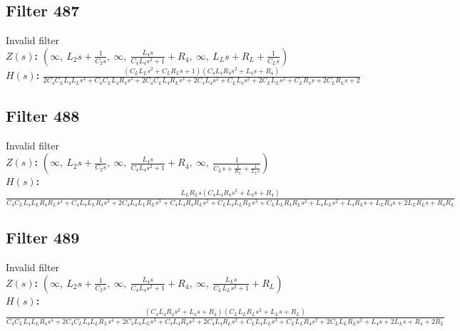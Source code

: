 \documentclass{article}
\begin{document}
\subsection*{Filter 487}
Invalid filter \\ 
\textbf{$Z(s)$:} $\left( \infty, \  L_{2} s + \frac{1}{C_{2} s}, \  \infty, \  \frac{L_{4} s}{C_{4} L_{4} s^{2} + 1} + R_{4}, \  \infty, \  L_{L} s + R_{L} + \frac{1}{C_{L} s}\right)$ \\ 
\textbf{$H(s)$:} $\frac{\left(C_{L} L_{L} s^{2} + C_{L} R_{L} s + 1\right) \left(C_{4} L_{4} R_{4} s^{2} + L_{4} s + R_{4}\right)}{2 C_{4} C_{L} L_{4} L_{L} s^{4} + C_{4} C_{L} L_{4} R_{4} s^{3} + 2 C_{4} C_{L} L_{4} R_{L} s^{3} + 2 C_{4} L_{4} s^{2} + C_{L} L_{4} s^{2} + 2 C_{L} L_{L} s^{2} + C_{L} R_{4} s + 2 C_{L} R_{L} s + 2}$ \\ 
\subsection*{Filter 488}
Invalid filter \\ 
\textbf{$Z(s)$:} $\left( \infty, \  L_{2} s + \frac{1}{C_{2} s}, \  \infty, \  \frac{L_{4} s}{C_{4} L_{4} s^{2} + 1} + R_{4}, \  \infty, \  \frac{1}{C_{L} s + \frac{1}{R_{L}} + \frac{1}{L_{L} s}}\right)$ \\ 
\textbf{$H(s)$:} $\frac{L_{L} R_{L} s \left(C_{4} L_{4} R_{4} s^{2} + L_{4} s + R_{4}\right)}{C_{4} C_{L} L_{4} L_{L} R_{4} R_{L} s^{4} + C_{4} L_{4} L_{L} R_{4} s^{3} + 2 C_{4} L_{4} L_{L} R_{L} s^{3} + C_{4} L_{4} R_{4} R_{L} s^{2} + C_{L} L_{4} L_{L} R_{L} s^{3} + C_{L} L_{L} R_{4} R_{L} s^{2} + L_{4} L_{L} s^{2} + L_{4} R_{L} s + L_{L} R_{4} s + 2 L_{L} R_{L} s + R_{4} R_{L}}$ \\ 
\subsection*{Filter 489}
Invalid filter \\ 
\textbf{$Z(s)$:} $\left( \infty, \  L_{2} s + \frac{1}{C_{2} s}, \  \infty, \  \frac{L_{4} s}{C_{4} L_{4} s^{2} + 1} + R_{4}, \  \infty, \  \frac{L_{L} s}{C_{L} L_{L} s^{2} + 1} + R_{L}\right)$ \\ 
\textbf{$H(s)$:} $\frac{\left(C_{4} L_{4} R_{4} s^{2} + L_{4} s + R_{4}\right) \left(C_{L} L_{L} R_{L} s^{2} + L_{L} s + R_{L}\right)}{C_{4} C_{L} L_{4} L_{L} R_{4} s^{4} + 2 C_{4} C_{L} L_{4} L_{L} R_{L} s^{4} + 2 C_{4} L_{4} L_{L} s^{3} + C_{4} L_{4} R_{4} s^{2} + 2 C_{4} L_{4} R_{L} s^{2} + C_{L} L_{4} L_{L} s^{3} + C_{L} L_{L} R_{4} s^{2} + 2 C_{L} L_{L} R_{L} s^{2} + L_{4} s + 2 L_{L} s + R_{4} + 2 R_{L}}$ \\ 
\end{document}
